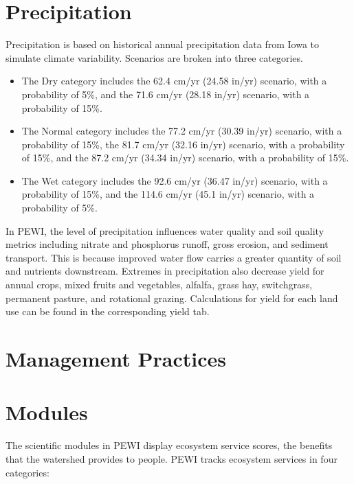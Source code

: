 \documentclass[11pt]{article}
\begin{document}
\section{Precipitation}
Precipitation is based on historical annual precipitation data from Iowa to simulate climate variability. Scenarios are broken into three categories.
\begin{itemize}
  \item The Dry category includes the 62.4 cm/yr (24.58 in/yr) scenario, with a probability of 5\%, and the 71.6 cm/yr (28.18 in/yr) scenario, with a probability of 15\%.
  \item The Normal category includes the 77.2 cm/yr (30.39 in/yr) scenario, with a probability of 15\%, the 81.7 cm/yr (32.16 in/yr) scenario, with a probability of 15\%, and the 87.2 cm/yr (34.34 in/yr) scenario, with a probability of 15\%.
  \item The Wet category includes the 92.6 cm/yr (36.47 in/yr) scenario, with a probability of 15\%, and the 114.6 cm/yr (45.1 in/yr) scenario, with a probability of 5\%.
\end{itemize}

In PEWI, the level of precipitation influences water quality and soil quality metrics including nitrate and phosphorus runoff, gross erosion, and sediment transport. This is because improved water flow carries a greater quantity of soil and nutrients downstream. Extremes in precipitation also decrease yield for annual crops, mixed fruits and vegetables, alfalfa, grass hay, switchgrass, permanent pasture, and rotational grazing.\cite{33}  Calculations for yield for each land use can be found in the corresponding yield tab.


\newpage
\section{Management Practices}


\newpage
\section{Modules}
The scientific modules in PEWI display ecosystem service scores, the benefits that the watershed provides to people. PEWI tracks ecosystem services in four categories:

\cleardoublepage
\end{document}
